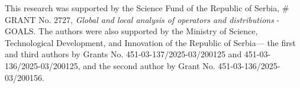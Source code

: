 \documentclass{article}
\theoremstyle{thmstyleone}
\theoremstyle{thmstyletwo}%
\theoremstyle{thmstylethree}%
\begin{document}

This research was supported by the Science Fund of the Republic of
Serbia, $\#$GRANT No. 2727, {\it Global and local analysis of operators and
distributions} - GOALS.  The authors were also supported by the Ministry of Science, Technological Development, and Innovation of the Republic of Serbia— the first and third authors by Grants No. 451-03-137/2025-03/200125 and 451-03-136/2025-03/200125, and the second author by Grant No. 451-03-136/2025-03/200156.

\end{document}
